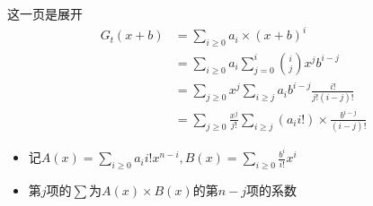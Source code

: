 \documentclass{beamer}
\begin{document}
\begin{frame}{这一页是展开}
    $$\begin{aligned}
        G_t(x + b) &= \sum_{i\geq 0}a_i\times (x + b)^i\\
        &= \sum_{i\geq 0}a_i\sum_{j = 0}^i{i\choose j}x^jb^{i-j}\\
        &= \sum_{j\geq 0}x^j\sum_{i\geq j}a_ib^{i-j}\frac{i!}{j!(i-j)!}\\
        &= \sum_{j\geq 0}\frac{x^j}{j!}\sum_{i\geq j}(a_ii!)\times \frac{b^{i - j}}{(i - j)!}
    \end{aligned}$$ \pause
    \begin{itemize}
        \item 记$A(x) = \sum_{i\geq 0}a_{i}i!x^{n-i},B(x)=\sum_{i\geq 0}\frac{b^i}{i!}x^i$
        \item 第$j$项的$\sum$为$A(x)\times B(x)$的第$n-j$项的系数
    \end{itemize}
\end{frame}
\end{document}
